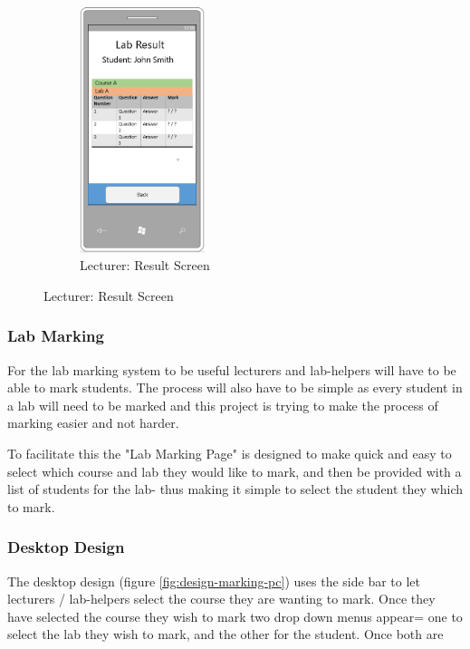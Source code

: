 \documentclass[12pt]{article}  %
\begin{document}
\begin{figure}[H]
\begin{subfigure}[c]{0.3\textwidth}
    \label{fig:design-result-select-mb}
\end{subfigure}
\hfill
\begin{subfigure}[c]{0.3\textwidth}
    \centering
    \includegraphics[width=0.4\textwidth]{images/design/result-lecturer-mobile.png}
    \caption{Lecturer: Result Screen}
    \label{fig:design-result-lecturer-mb}
\end{subfigure}
\end{figure}




\subsubsection{Lab Marking}
For the lab marking system to be useful lecturers and lab-helpers will have to be able to mark students. The process will also have to be simple as every student in a lab will need to be marked and this project is trying to make the process of marking easier and not harder. 

To facilitate this the "Lab Marking Page" is designed to make quick and easy to select which course and lab they would like to mark, and then be provided with a list of students for the lab- thus making it simple to select the student they which to mark.

\subsubsection*{Desktop Design}

The desktop design (figure \ref{fig:design-marking-pc}) uses the side bar to let lecturers / lab-helpers select the course they are wanting to mark. Once they have selected the course they wish to mark two drop down menus appear= one to select the lab they wish to mark,  and the other for the student. Once both are 
\end{document}
